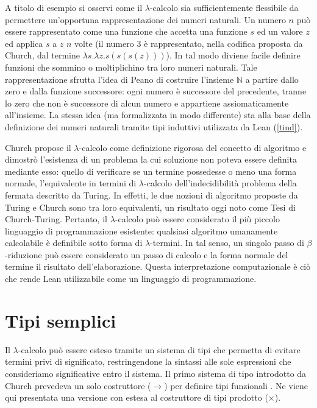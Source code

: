 A titolo di esempio si osservi come il $\lambda$-calcolo sia sufficientemente flessibile da permettere un'opportuna rappresentazione dei numeri naturali. Un numero $n$ può essere rappresentato come una funzione che accetta una funzione $s$ ed un valore $z$ ed applica $s$ a $z$ $n$ volte (il numero 3 è rappresentato, nella codifica proposta da Church, dal termine $\lambda s.\lambda z. s(s(s(z)))$). In tal modo diviene facile definire funzioni che sommino o moltiplichino tra loro numeri naturali. Tale rappresentazione sfrutta l'idea di Peano di costruire l'insieme $\mathbb{N}$ a partire dallo zero e dalla funzione successore: ogni numero è successore del precedente, tranne lo zero che non è successore di alcun numero e appartiene assiomaticamente all'insieme. La stessa idea (ma formalizzata in modo differente) sta alla base della definizione dei numeri naturali tramite tipi induttivi utilizzata da Lean (\ref{tind}).

Church propose il $\lambda$-calcolo come definizione rigorosa del concetto di algoritmo e dimostrò l'esistenza di un problema la cui soluzione non poteva essere definita mediante esso: quello di verificare se un termine possedesse o meno una forma normale, l'equivalente in termini di $\lambda$-calcolo dell'indecidibilità problema della fermata descritto da Turing. In effetti, le due nozioni di algoritmo proposte da Turing e Church sono tra loro equivalenti, un risultato oggi noto come Tesi di Church-Turing. Pertanto, il $\lambda$-calcolo può essere considerato il più piccolo linguaggio di programmazione esistente: qualsiasi algoritmo umanamente calcolabile è definibile sotto forma di $\lambda$-termini. In tal senso, un singolo passo di $\beta$-riduzione può essere considerato un passo di calcolo e la forma normale del termine il risultato dell'elaborazione. Questa interpretazione computazionale è ciò che rende Lean utilizzabile come un linguaggio di programmazione.

\section{Tipi semplici} \label{tsemp}
Il $\lambda$-calcolo può essere esteso tramite un sistema di tipi che permetta di evitare termini privi di significato, restringendone la sintassi alle sole espressioni che consideriamo significative entro il sistema. Il primo sistema di tipo introdotto da Church prevedeva un solo costruttore ($\rightarrow$) per definire tipi funzionali \cite{10.2307/2266170}. Ne viene qui presentata una versione con estesa al costruttore di tipi prodotto ($\times$).

